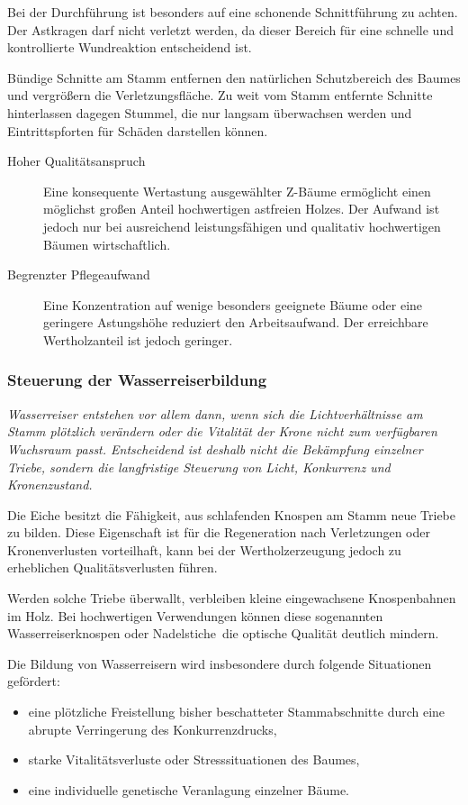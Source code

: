 \documentclass[twocolumn, bibliography=totoc, abstract=true]{scrartcl}
\begin{document}
Bei der Durchführung ist besonders auf eine schonende Schnittführung zu achten. Der Astkragen darf nicht verletzt werden, da dieser Bereich für eine schnelle und kontrollierte Wundreaktion entscheidend ist.

Bündige Schnitte am Stamm entfernen den natürlichen Schutzbereich des Baumes und vergrößern die Verletzungsfläche. Zu weit vom Stamm entfernte Schnitte hinterlassen dagegen Stummel, die nur langsam überwachsen werden und Eintrittspforten für Schäden darstellen können.

\begin{description}
\item[Hoher Qualitätsanspruch] Eine konsequente Wertastung ausgewählter Z-Bäume ermöglicht einen möglichst großen Anteil hochwertigen astfreien Holzes. Der Aufwand ist jedoch nur bei ausreichend leistungsfähigen und qualitativ hochwertigen Bäumen wirtschaftlich.
\item[Begrenzter Pflegeaufwand] Eine Konzentration auf wenige besonders geeignete Bäume oder eine geringere Astungshöhe reduziert den Arbeitsaufwand. Der erreichbare Wertholzanteil ist jedoch geringer.
\end{description}

\subsubsection{Steuerung der Wasserreiserbildung}

\emph{Wasserreiser entstehen vor allem dann, wenn sich die Lichtverhältnisse am Stamm plötzlich verändern oder die Vitalität der Krone nicht zum verfügbaren Wuchsraum passt. Entscheidend ist deshalb nicht die Bekämpfung einzelner Triebe, sondern die langfristige Steuerung von Licht, Konkurrenz und Kronenzustand.}

Die Eiche besitzt die Fähigkeit, aus schlafenden Knospen am Stamm neue Triebe zu bilden. Diese Eigenschaft ist für die Regeneration nach Verletzungen oder Kronenverlusten vorteilhaft, kann bei der Wertholzerzeugung jedoch zu erheblichen Qualitätsverlusten führen.

Werden solche Triebe überwallt, verbleiben kleine eingewachsene Knospenbahnen im Holz. Bei hochwertigen Verwendungen können diese sogenannten Wasserreiserknospen oder \glqq Nadelstiche\grqq\ die optische Qualität deutlich mindern.

Die Bildung von Wasserreisern wird insbesondere durch folgende Situationen gefördert:

\begin{itemize}
\item eine plötzliche Freistellung bisher beschatteter Stammabschnitte durch eine abrupte Verringerung des Konkurrenzdrucks,
\item starke Vitalitätsverluste oder Stresssituationen des Baumes,
\item eine individuelle genetische Veranlagung einzelner Bäume.
\end{itemize}
\end{document}
